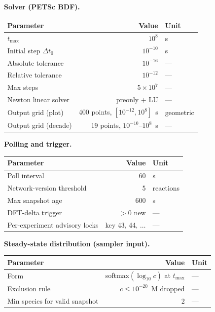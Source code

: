 \bigskip

\noindent\textbf{Solver (PETSc BDF).}\par\nopagebreak
\noindent\begin{tabular}{p{5cm}rl}
\toprule
Parameter & Value & Unit \\
\midrule
$t_\text{max}$ & $10^{8}$ & s \\
Initial step $\Delta t_0$ & $10^{-10}$ & s \\
Absolute tolerance & $10^{-16}$ & --- \\
Relative tolerance & $10^{-12}$ & --- \\
Max steps & $5 \times 10^{7}$ & --- \\
Newton linear solver & preonly + LU & --- \\
Output grid (plot) & 400 points, $[10^{-12}, 10^{8}]$~s & geometric \\
Output grid (decade) & 19 points, $10^{-10}$--$10^{8}$~s & --- \\
\bottomrule
\end{tabular}

\bigskip

\noindent\textbf{Polling and trigger.}\par\nopagebreak
\noindent\begin{tabular}{p{5cm}rl}
\toprule
Parameter & Value & Unit \\
\midrule
Poll interval & 60 & s \\
Network-version threshold & 5 & reactions \\
Max snapshot age & 600 & s \\
DFT-delta trigger & $> 0$ new & --- \\
Per-experiment advisory locks & key 43, 44, $\ldots$ & --- \\
\bottomrule
\end{tabular}

\bigskip

\noindent\textbf{Steady-state distribution (sampler input).}\par\nopagebreak
\noindent\begin{tabular}{p{5cm}rl}
\toprule
Parameter & Value & Unit \\
\midrule
Form & softmax$(\log_{10} c)$ at $t_\text{max}$ & --- \\
Exclusion rule & $c \leq 10^{-20}$~M dropped & --- \\
Min species for valid snapshot & 2 & --- \\
\bottomrule
\end{tabular}

